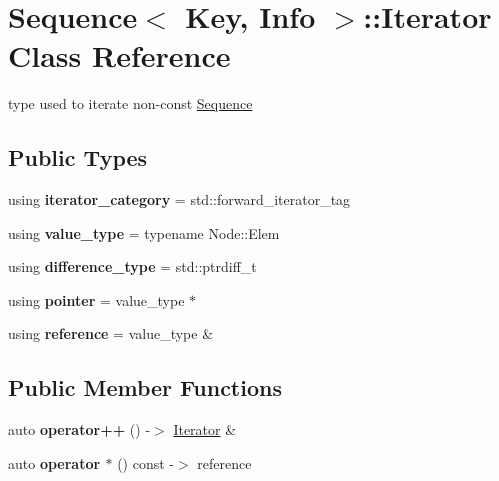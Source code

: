 \hypertarget{structSequence_1_1Iterator}{}\section{Sequence$<$ Key, Info $>$\+::Iterator Class Reference}
\label{structSequence_1_1Iterator}


type used to iterate non-\/const \mbox{\hyperlink{structSequence}{Sequence}}  


\subsection*{Public Types}
\begin{DoxyCompactItemize}
\item 
\mbox{\label{structSequence_1_1Iterator_a4ccc86483dd16377949d5a0ef0f75374}} 
using {\bfseries iterator\+\_\+category} = std\+::forward\+\_\+iterator\+\_\+tag
\item 
\mbox{\label{structSequence_1_1Iterator_a3fc63bdb6aefbbad7940485736bd2193}} 
using {\bfseries value\+\_\+type} = typename Node\+::\+Elem
\item 
\mbox{\label{structSequence_1_1Iterator_a6a1dd9d0ad1783202a99949175334c89}} 
using {\bfseries difference\+\_\+type} = std\+::ptrdiff\+\_\+t
\item 
\mbox{\label{structSequence_1_1Iterator_a18b3505ba96f4698b292c26c53d1455c}} 
using {\bfseries pointer} = value\+\_\+type $\ast$
\item 
\mbox{\label{structSequence_1_1Iterator_a45255aef8105d5adedc35f951e09df79}} 
using {\bfseries reference} = value\+\_\+type \&
\end{DoxyCompactItemize}
\subsection*{Public Member Functions}
\begin{DoxyCompactItemize}
\item 
\mbox{\label{structSequence_1_1Iterator_a1c961d13dfe3e70f57374d7650422d64}} 
auto {\bfseries operator++} () -\/$>$ \mbox{\hyperlink{structSequence_1_1Iterator}{Iterator}} \&
\item 
\mbox{\label{structSequence_1_1Iterator_abc27dcfd690bd594ca54b862547e5436}} 
auto {\bfseries operator $\ast$} () const -\/$>$ reference
\end{DoxyCompactItemize}
